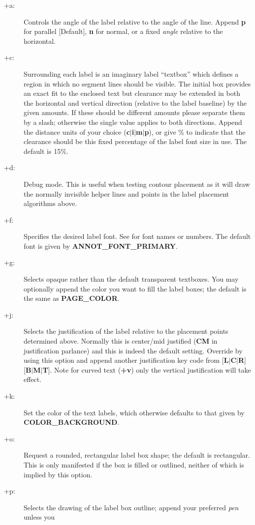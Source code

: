 \begin{description}
\item [+a:]  Controls the angle of the label relative to the angle of the line.  Append {\bf p}
for parallel [Default], {\bf n} for normal, or a fixed {\it angle} relative to the
horizontal.
\item [+c:] Surrounding each label is an imaginary label ``textbox'' which defines a region in
which no segment lines should be visible.  The initial box provides an exact fit to the enclosed
text but clearance may be extended in both the horizontal and vertical direction (relative to the label
baseline) by the given amounts.  If these should be different amounts please separate them by
a slash; otherwise the single value applies to both directions.  Append the distance units of
your choice ({\bf c$|$i$|$m$|$p}), or give \% to indicate that the clearance should be this
fixed percentage of the label font size in use.  The default is 15\%.
\item [+d:] Debug mode.  This is useful when testing contour placement as it will draw the normally
invisible helper lines and points in the label placement algorithms above.
\item [+f:] Specifies the desired label font.  See  for font names or numbers.  The
default font is given by {\bf ANNOT\_FONT\_PRIMARY}.
\item [+g:] Selects opaque rather than the default transparent textboxes.  You may optionally append
the color you want to fill the label boxes; the default is the same as {\bf PAGE\_COLOR}.
\item [+j:] Selects the justification of the label relative to the placement points determined
above.  Normally this is center/mid justified ({\bf CM} in  justification parlance) and
this is indeed the default setting.  Override by using this option and append another justification
key code from [{\bf L$|$C$|$R}][{\bf B$|$M$|$T}].  Note for curved text ({\bf +v}) only the vertical
justification will take effect.
\item [+k:] Set the color of the text labels, which otherwise defaults to that given by {\bf COLOR\_BACKGROUND}.
\item [+o:] Request a rounded, rectangular label box shape; the default is rectangular.  This is only
manifested if the box is filled or outlined, neither of which is implied by this option.
\item [+p:] Selects the drawing of the label box outline; append your preferred {\it pen} unless you

\end{description}
